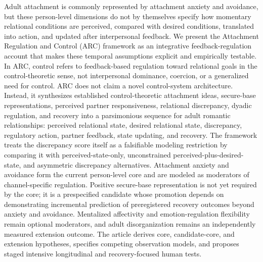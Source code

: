 Adult attachment is commonly represented by attachment anxiety and avoidance, but these person-level dimensions do not by themselves specify how momentary relational conditions are perceived, compared with desired conditions, translated into action, and updated after interpersonal feedback. We present the Attachment Regulation and Control (ARC) framework as an integrative feedback-regulation account that makes these temporal assumptions explicit and empirically testable. In ARC, control refers to feedback-based regulation toward relational goals in the control-theoretic sense, not interpersonal dominance, coercion, or a generalized need for control. ARC does not claim a novel control-system architecture. Instead, it synthesizes established control-theoretic attachment ideas, secure-base representations, perceived partner responsiveness, relational discrepancy, dyadic regulation, and recovery into a parsimonious sequence for adult romantic relationships: perceived relational state, desired relational state, discrepancy, regulatory action, partner feedback, state updating, and recovery. The framework treats the discrepancy score itself as a falsifiable modeling restriction by comparing it with perceived-state-only, unconstrained perceived-plus-desired-state, and asymmetric discrepancy alternatives. Attachment anxiety and avoidance form the current person-level core and are modeled as moderators of channel-specific regulation. Positive secure-base representation is not yet required by the core; it is a prespecified candidate whose promotion depends on demonstrating incremental prediction of preregistered recovery outcomes beyond anxiety and avoidance. Mentalized affectivity and emotion-regulation flexibility remain optional moderators, and adult disorganization remains an independently measured extension outcome. The article derives core, candidate-core, and extension hypotheses, specifies competing observation models, and proposes staged intensive longitudinal and recovery-focused human tests.
